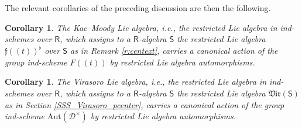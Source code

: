 \documentclass{amsart}
\newtheorem{Cor}[Thm]{Corollary}
\theoremstyle{definition}
\newcommand{\D}{\sD}
\newcommand{\sD}{\mathscr{D}}
\newcommand{\Sing}{\mathsf{S}}
\newcommand{\on}{\mathrm}
\newcommand{\Ring}{\mathsf{R}}
\newcommand{\ff}{\mathfrak{f}}
\numberwithin{equation}{section}
\begin{document}
The relevant corollaries of the preceding discussion are then the following. 

\begin{Cor} \label{c:kmadj} The Kac--Moody Lie algebra, i.e., the restricted Lie algebra in ind-schemes over $\Ring$, which assigns to a $\Ring$-algebra $\Sing$ the restricted Lie algebra $\ff(\!(t)\!)^\flat$ over $\Sing$ as in Remark \ref{r:centext}, carries a canonical action of the group ind-scheme $F(\!(t)\!)$ by restricted Lie algebra automorphisms. 
\end{Cor}


\begin{Cor} The Virasoro Lie algebra, i.e., the restricted Lie algebra in ind-schemes over $\Ring$, which assigns to a $\Ring$-algebra $\Sing$ the restricted Lie algebra $\mathfrak{Vir}(\Sing)$ as in Section \ref{SSS_Virasoro_pcenter}, carries a canonical action of the group ind-scheme $\on{Aut}(\D^\times)$ by restricted Lie algebra automorphisms.
\end{Cor}
\end{document}
